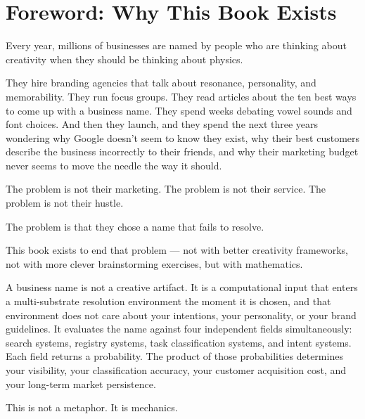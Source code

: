 \documentclass[12pt, openany]{book}
\theoremstyle{thmstyle}
\theoremstyle{defstyle}
\begin{document}
\tableofcontents
\newpage

\chapter*{Foreword: Why This Book Exists}

Every year, millions of businesses are named by people who are thinking about creativity when they should be thinking about physics.

They hire branding agencies that talk about resonance, personality, and memorability. They run focus groups. They read articles about the ten best ways to come up with a business name. They spend weeks debating vowel sounds and font choices. And then they launch, and they spend the next three years wondering why Google doesn't seem to know they exist, why their best customers describe the business incorrectly to their friends, and why their marketing budget never seems to move the needle the way it should.

The problem is not their marketing. The problem is not their service. The problem is not their hustle.

The problem is that they chose a name that fails to resolve.

\vspace{8pt}

This book exists to end that problem --- not with better creativity frameworks, not with more clever brainstorming exercises, but with mathematics.

A business name is not a creative artifact. It is a computational input that enters a multi-substrate resolution environment the moment it is chosen, and that environment does not care about your intentions, your personality, or your brand guidelines. It evaluates the name against four independent fields simultaneously: search systems, registry systems, task classification systems, and intent systems. Each field returns a probability. The product of those probabilities determines your visibility, your classification accuracy, your customer acquisition cost, and your long-term market persistence.

This is not a metaphor. It is mechanics.
\end{document}
